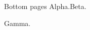 \documentclass{beamer}
\begin{document}
\begin{frame}[b,allowframebreaks]{Bottom pages}
Alpha.\newpage Beta.\par\framebreak Gamma.
\end{frame}
\end{document}
